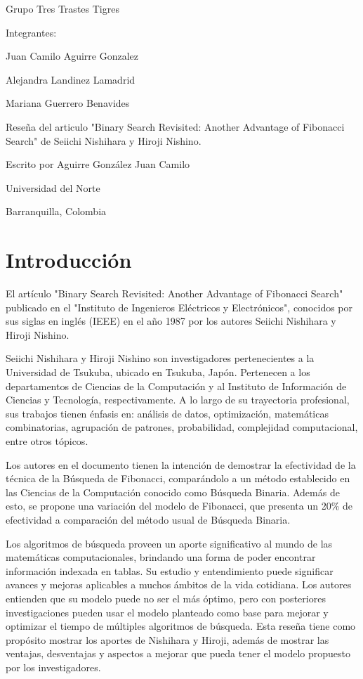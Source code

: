 \documentclass{article}
\begin{document}
Grupo Tres Trastes Tigres

Integrantes:

    Juan Camilo Aguirre Gonzalez
    
    Alejandra Landinez Lamadrid 
    
    Mariana Guerrero Benavides


\vspace{0.5cm}
Reseña del articulo "Binary Search Revisited: Another Advantage of Fibonacci Search" de Seiichi Nishihara y Hiroji Nishino.


Escrito por Aguirre González Juan Camilo

    Universidad del Norte
    
    Barranquilla, Colombia
    
\section{Introducción}

El artículo "Binary Search Revisited: Another Advantage of Fibonacci Search" \cite{5009548} publicado en el "Instituto de Ingenieros Eléctricos y Electrónicos", conocidos por sus siglas en inglés  (IEEE) en el año 1987 por los autores Seiichi Nishihara y Hiroji Nishino.


Seiichi Nishihara y Hiroji Nishino son investigadores pertenecientes a la Universidad de Tsukuba, ubicado en Tsukuba, Japón. Pertenecen a los departamentos de Ciencias de la Computación y al Instituto de Información de Ciencias y Tecnología, respectivamente. A lo largo de su trayectoria profesional, sus trabajos tienen énfasis en: análisis de datos, optimización, matemáticas combinatorias, agrupación de patrones, probabilidad, complejidad computacional, entre otros tópicos.

Los autores en el documento tienen la intención de demostrar la efectividad de la técnica de la Búsqueda de Fibonacci, comparándolo a un método establecido en las Ciencias de la Computación conocido como Búsqueda Binaria. Además de esto, se propone una variación del modelo de Fibonacci, que presenta un 20\%  de efectividad a comparación del método usual de Búsqueda Binaria.

Los algoritmos de búsqueda proveen un aporte significativo al mundo de las matemáticas computacionales, brindando una forma de poder encontrar información indexada en tablas. Su estudio y entendimiento puede significar avances y mejoras aplicables a muchos ámbitos de la vida cotidiana. Los autores entienden que su modelo puede no ser el más óptimo, pero con posteriores investigaciones pueden usar el modelo planteado como base para mejorar y optimizar el tiempo de múltiples algoritmos de búsqueda.
Esta reseña tiene como propósito mostrar los aportes de Nishihara y Hiroji, además de mostrar las ventajas, desventajas y aspectos a mejorar que pueda tener el modelo propuesto por los investigadores.
\end{document}
